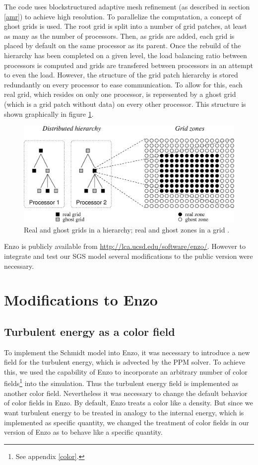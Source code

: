 The code uses blockstructured adaptive mesh refinement (as described in 
section \ref{amr}) to achieve high resolution. To parallelize the computation,
a concept of ghost grids is used. The root grid is split into a number of grid
patches, at least as many as the number of processors. Then, as grids
are added, each grid is placed by default on the same processor as its parent.
Once the rebuild of the hierarchy has been completed on a given level, the load
balancing ratio between processors is computed and grids are transfered between
processors in an attempt to even the load. However, the structure of the
grid patch hierarchy is stored redundantly on every processor to ease
communication. To allow for this, each real grid, which resides on only one
processor, is represented by a ghost grid (which is a grid patch without data)
on every other processor. This structure is shown graphically in figure
\ref{fig:ghost}. 

\begin{figure}[tp]
\centering
\includegraphics[width=0.7\linewidth]{chapter7/norman-f2.eps}
\caption{Real and ghost grids in a hierarchy; real and ghost zones in a grid 
\citep{Norman2007}.}
\label{fig:ghost}
\end{figure}

Enzo is publicly available from \url{http://lca.ucsd.edu/software/enzo/}.
However to integrate and test our SGS model several modifications to the public
version were necessary.

\section{Modifications to Enzo}
\subsection{Turbulent energy as a color field}
To implement the Schmidt model into Enzo, it was necessary to introduce a new
field for the turbulent energy, which is advected by the PPM solver. To achieve
this, we used the capability of Enzo to incorporate an arbitrary number of
color fields\footnote{See appendix \ref{color}.} into the simulation. Thus the
turbulent energy field is implemented as another color field. Nevertheless it
was necessary to change the default behavior of color fields in Enzo. By
default, Enzo treats a color like a density. But since we want turbulent energy
to be treated in analogy to the internal energy, which is implemented as
specific quantity, we changed the treatment of color fields in our version of
Enzo as to behave like a specific quantity.

